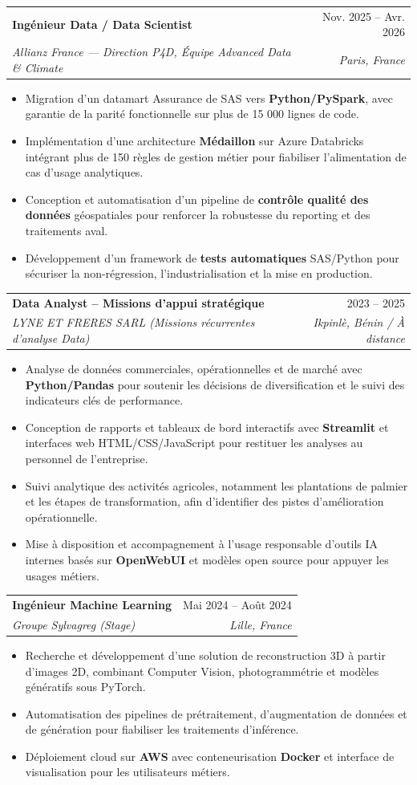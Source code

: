 \documentclass[letterpaper,11pt]{article}
\makeatletter
\newcommand{\resumeItem}[1]{
  \item\small{{#1 \vspace{-1.5pt}}}
}
\newcommand{\resumeSubheading}[4]{
  \vspace{1pt}\item
    \begin{tabular*}{0.97\textwidth}[t]{l@{\extracolsep{\fill}}r}
      {\color{primary}\textbf{#1}} & #2 \\
      \textit{\small#3} & \textit{\small #4} \\
    \end{tabular*}\vspace{-4pt}
}
\newcommand{\resumeItemListStart}{\begin{itemize}[leftmargin=0.15in, label={\small\textbullet}, itemsep=1.5pt, parsep=0pt, topsep=2pt, partopsep=0pt]}
\newcommand{\resumeItemListEnd}{\end{itemize}\vspace{-1pt}}
\makeatother
\begin{document}
\resumeSubheading
{Ingénieur Data / Data Scientist}{Nov. 2025 -- Avr. 2026}
{Allianz France --- Direction P4D, Équipe Advanced Data \& Climate}{Paris, France}
\resumeItemListStart
  \resumeItem{Migration d'un datamart Assurance de SAS vers \textbf{Python/PySpark}, avec garantie de la parité fonctionnelle sur plus de 15 000 lignes de code.}
  \resumeItem{Implémentation d'une architecture \textbf{Médaillon} sur Azure Databricks intégrant plus de 150 règles de gestion métier pour fiabiliser l'alimentation de cas d'usage analytiques.}
  \resumeItem{Conception et automatisation d'un pipeline de \textbf{contrôle qualité des données} géospatiales pour renforcer la robustesse du reporting et des traitements aval.}
  \resumeItem{Développement d'un framework de \textbf{tests automatiques} SAS/Python pour sécuriser la non-régression, l'industrialisation et la mise en production.}
\resumeItemListEnd

\resumeSubheading
{Data Analyst -- Missions d'appui stratégique}{2023 -- 2025}
{LYNE ET FRERES SARL \normalfont\small(Missions récurrentes d'analyse Data)}{Ikpinlè, Bénin / À distance}
\resumeItemListStart
  \resumeItem{Analyse de données commerciales, opérationnelles et de marché avec \textbf{Python/Pandas} pour soutenir les décisions de diversification et le suivi des indicateurs clés de performance.}
  \resumeItem{Conception de rapports et tableaux de bord interactifs avec \textbf{Streamlit} et interfaces web HTML/CSS/JavaScript pour restituer les analyses au personnel de l'entreprise.}
  \resumeItem{Suivi analytique des activités agricoles, notamment les plantations de palmier et les étapes de transformation, afin d'identifier des pistes d'amélioration opérationnelle.}
  \resumeItem{Mise à disposition et accompagnement à l'usage responsable d'outils IA internes basés sur \textbf{OpenWebUI} et modèles open source pour appuyer les usages métiers.}
\resumeItemListEnd

\resumeSubheading
{Ingénieur Machine Learning}{Mai 2024 -- Août 2024}
{Groupe Sylvagreg \normalfont\small(Stage)}{Lille, France} 
\resumeItemListStart
  \resumeItem{Recherche et développement d'une solution de reconstruction 3D à partir d'images 2D, combinant Computer Vision, photogrammétrie et modèles génératifs sous PyTorch.}
  \resumeItem{Automatisation des pipelines de prétraitement, d'augmentation de données et de génération pour fiabiliser les traitements d'inférence.}
  \resumeItem{Déploiement cloud sur \textbf{AWS} avec conteneurisation \textbf{Docker} et interface de visualisation pour les utilisateurs métiers.}
\resumeItemListEnd
\end{document}
